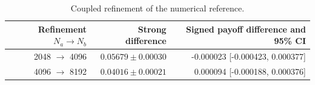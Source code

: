 \begin{table}[H]\centering\small
\caption{Coupled refinement of the numerical reference.}
\begin{tabular}{rrr}\toprule
Refinement $N_a\to N_b$ & Strong difference & Signed payoff difference and 95\% CI\\\midrule
2048 $\to$ 4096 & $0.05679\pm0.00030$ & -0.000023 [-0.000423, 0.000377]\\
4096 $\to$ 8192 & $0.04016\pm0.00021$ & 0.000094 [-0.000188, 0.000376]\\
\bottomrule\end{tabular}
\end{table}
